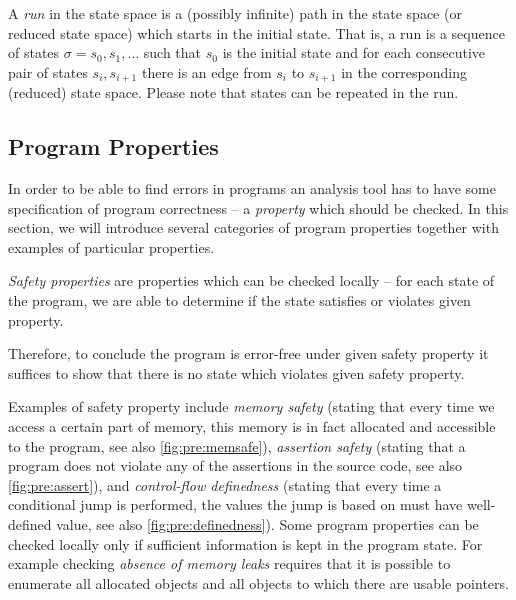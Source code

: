 \begin{definition}[Run]
A \emph{run} in the state space is a (possibly infinite) path in the state space (or reduced state space) which starts in the initial state.
That is, a run is a sequence of states $\sigma = s_0, s_1, …$ such that $s_0$ is the initial state and for each consecutive pair of states $s_i, s_{i+1}$ there is an edge from $s_i$ to $s_{i + 1}$ in the corresponding (reduced) state space.
Please note that states can be repeated in the run.
\end{definition}


\subsection{Program Properties}

In order to be able to find errors in programs an analysis tool has to have
some specification of program correctness -- a \emph{property} which should be
checked.
In this section, we will introduce several categories of program properties
together with examples of particular properties.

\begin{definition}
\emph{Safety properties} are properties which can be checked locally -- for
each state of the program, we are able to determine if the state satisfies or
violates given property.
\end{definition}

Therefore, to conclude the program is error-free under given safety property it
suffices to show that there is no state which violates given safety property.

Examples of safety property include \emph{memory safety} (stating that every
time we access a certain part of memory, this memory is in fact allocated and
accessible to the program, see also \autoref{fig:pre:memsafe}), \emph{assertion
safety} (stating that a program does not violate any of the assertions in the
source code, see also \autoref{fig:pre:assert}), and \emph{control-flow
definedness} (stating that every time a conditional jump is performed, the
values the jump is based on must have well-defined value, see also
\autoref{fig:pre:definedness}).
Some program properties can be checked locally only if sufficient information
is kept in the program state.
For example checking \emph{absence of memory leaks} requires that it is
possible to enumerate all allocated objects and all objects to which there are
usable pointers.

\bigskip

